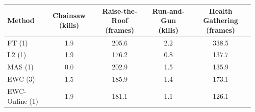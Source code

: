 \begin{tabular}{lcccc}
\toprule
Method & Chainsaw (kills) & Raise-the-Roof (frames) & Run-and-Gun (kills) & Health Gathering (frames) \\
\midrule
FT (1) & 1.9 & 205.6 & 2.2 & 338.5 \\
L2 (1) & 1.9 & 176.2 & 0.8 & 137.7 \\
MAS (1) & 0.0 & 202.9 & 1.5 & 135.9 \\
EWC (3) & 1.5 & 185.9 & 1.4 & 173.1 \\
EWC-Online (1) & 1.9 & 181.1 & 1.1 & 126.1 \\
\bottomrule
\end{tabular}